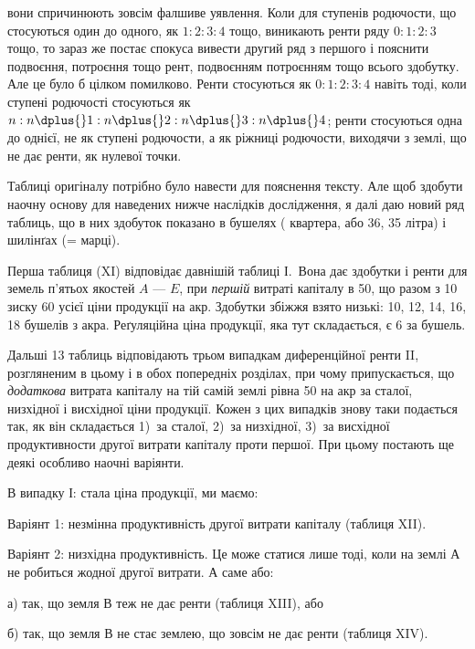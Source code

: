 \parcont{}  %
вони спричинюють зовсім фалшиве уявлення. Коли для ступенів родючости, що
стосуються один до одного, як $1: 2 : 3 : 4$ тощо, виникають ренти ряду $0 : 1 : 2 : 3$
тощо, то зараз же постає спокуса вивести другий ряд з першого і пояснити
подвоєння, потроєння тощо рент, подвоєнням потроєнням тощо всього здобутку.
Але це було б цілком помилково. Ренти стосуються як $0 : 1 : 2 : 3 : 4$ навіть
тоді, коли ступені родючості стосуються як $n : n \dplus{} 1 : n \dplus{} 2 : n \dplus{} 3 : n \dplus{} 4$;
ренти стосуються одна до однієї, не як ступені родючости, а як ріжниці родючости,
виходячи з землі, що не дає ренти, як нулевої точки.

Таблиці оригіналу потрібно було навести для пояснення тексту. Але щоб
здобути наочну основу для наведених нижче наслідків дослідження, я далі
даю новий ряд таблиць, що в них здобуток показано в бушелях (  квартера,
або 36, 35 літра) і шилінґах (= марці).

Перша таблиця (XI) відповідає давнішій таблиці І.~Вона дає здобутки
і ренти для земель п’ятьох якостей $A$ — $E$, при \emph{першій} витраті капіталу в 50, що разом з 10 зиску \deq{} 60 усієї ціни продукції на акр. Здобутки
збіжжя взято низькі: 10, 12, 14, 16, 18 бушелів з акра. Реґуляційна
ціна продукції, яка тут складається, є 6 за бушель.

Дальші 13 таблиць відповідають трьом випадкам диференційної ренти II,
розгляненим в цьому і в обох попередніх розділах, при чому припускається, що
\emph{додаткова} витрата капіталу на тій самій землі рівна 50 на акр за сталої,
низхідної і висхідної ціни продукції. Кожен з цих випадків знову таки
подається так, як він складається 1)~за сталої, 2)~за низхідної, 3)~за висхідної
продуктивности другої витрати капіталу проти першої. При цьому постають ще
деякі особливо наочні варіянти.

В випадку І: стала ціна продукції, ми маємо:

Варіянт 1: незмінна продуктивність другої витрати капіталу (таблиця XII).

Варіянт 2: низхідна продуктивність. Це може статися лише тоді, коли на землі
А не робиться жодної другої витрати. А саме або:

а) так, що земля $В$ теж не дає ренти (таблиця XIII), або

б) так, що земля $В$ не стає землею, що зовсім не дає ренти (таблиця XIV).

